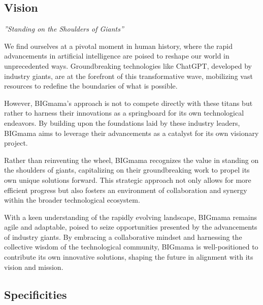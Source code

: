 \subsection{Vision}

\begin{flushright}
    \small{\it{''Standing on the Shoulders of Giants''}}
\end{flushright}


\noindent We find ourselves at a pivotal moment in human history, where the rapid advancements in artificial intelligence are poised to reshape our world in unprecedented ways. Groundbreaking technologies like ChatGPT, developed by industry giants, are at the forefront of this transformative wave, mobilizing vast resources to redefine the boundaries of what is possible.

However, BIGmama's approach is not to compete directly with these titans but rather to harness their innovations as a springboard for its own technological endeavors. By building upon the foundations laid by these industry leaders, BIGmama aims to leverage their advancements as a catalyst for its own visionary project.

Rather than reinventing the wheel, BIGmama recognizes the value in standing on the shoulders of giants, capitalizing on their groundbreaking work to propel its own unique solutions forward. This strategic approach not only allows for more efficient progress but also fosters an environment of collaboration and synergy within the broader technological ecosystem.

With a keen understanding of the rapidly evolving landscape, BIGmama remains agile and adaptable, poised to seize opportunities presented by the advancements of industry giants. By embracing a collaborative mindset and harnessing the collective wisdom of the technological community, BIGmama is well-positioned to contribute its own innovative solutions, shaping the future in alignment with its vision and mission.

\subsection{Specificities} \label{specificities}

